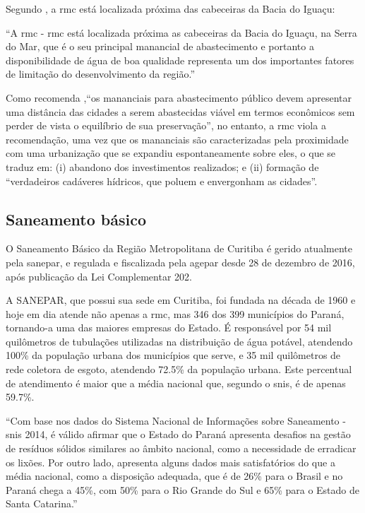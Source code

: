 	Segundo , a \gls{rmc} está localizada próxima das cabeceiras da Bacia do Iguaçu:
	
	\begin{citacao}
		``A \glsdesc{rmc} - \gls{rmc} está localizada próxima as cabeceiras da Bacia do Iguaçu, na Serra do Mar, que é o seu principal manancial de abastecimento e portanto a disponibilidade de água de boa qualidade representa um dos importantes fatores de limitação do desenvolvimento da região.''
	\end{citacao}

	Como recomenda \cite[p. 6]{andreoli1999a},``os mananciais para abastecimento público devem apresentar uma distância das cidades a serem abastecidas viável em termos econômicos sem perder de vista o equilíbrio de sua preservação'', no entanto, a \gls{rmc} viola a recomendação, uma vez que os mananciais são caracterizadas pela proximidade com uma urbanização que se expandiu espontaneamente sobre eles, o que se traduz em: (i) abandono dos investimentos realizados; e (ii) formação de ``verdadeiros cadáveres hídricos, que poluem e envergonham as cidades''.

	\subsection{Saneamento básico}
	
	O Saneamento Básico da Região Metropolitana de Curitiba é gerido atualmente pela \gls{sanepar}, e regulada e fiscalizada pela \gls{agepar} desde 28 de dezembro de 2016, após publicação da Lei Complementar 202.
	
	A SANEPAR, que possui sua sede em Curitiba, foi fundada na década de 1960 e hoje em dia atende não apenas a \gls{rmc}, mas 346 dos 399 municípios do Paraná, tornando-a uma das maiores empresas do Estado. É responsável por 54 mil quilômetros de tubulações utilizadas na distribuição de água potável, atendendo 100\% da população urbana dos municípios que serve, e 35 mil quilômetros de rede coletora de esgoto, atendendo 72.5\% da população urbana. Este percentual de atendimento é maior que a média nacional que, segundo o \gls{snis}, é de apenas 59.7\%. 
	
	\begin{citacao}
		``Com base nos dados do Sistema Nacional de Informações sobre Saneamento - \gls{snis} 2014, é válido afirmar que o Estado do Paraná apresenta desafios na gestão de resíduos sólidos similares ao âmbito nacional, como a necessidade de erradicar os lixões. Por outro lado, apresenta alguns dados mais satisfatórios do que a média nacional, como a disposição adequada, que é de 26\% para o Brasil e no Paraná chega a 45\%, com 50\% para o Rio Grande do Sul e 65\% para o Estado de Santa Catarina.'' \cite{anjos2016a}
	\end{citacao}

